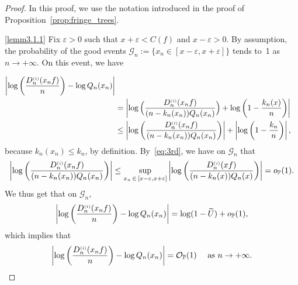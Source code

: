 \documentclass[10pt]{amsart}
\theoremstyle{definition}\newtheorem{defi}[theo]{Definition}\newtheorem{rema}[theo]{Remark}\newtheorem{exam}[theo]{Example}\newtheorem{exem}[theo]{Example}\newtheorem{nota}[theo]{Notation}
\newcommand{\sss}{\ensuremath{\scriptscriptstyle}}
\newcommand{\op}{{o_{\bbP}}}
\newcommand{\Op}{{\mathcal O_{\bbP}}}
\newcommand{\bbP}{\mathbb{P}}
\newcommand{\clG}{\mathcal{G}}
\begin{document}
\begin{proof}
In this proof, we use the notation introduced in the proof of Proposition~\ref{prop:fringe_trees}.

\noindent\eqref{lemm3.1.1} Fix $\varepsilon>0$ such that $x+\varepsilon<C(f)$ and $x-\varepsilon >0.$ By assumption, the probability of the good events $\clG_n := \{x_n\in [x-\varepsilon, x+\varepsilon]\}$ tends to~1 as $n\to+\infty$. On this event, we have

\begin{align*}
\left|\log\left(\frac{D_n^{\sss (i)}(x_n f)}n \right)-\log Q_n(x_n)\right|\\
&= \left|\log\Big(\frac{D_n^{\sss (i)}(x_n f)}{(n-k_n(x_n))Q_n(x_n)}\Big)+\log \left(1-\frac{k_n(x)}{n}\right)\right|\\
&\leq \left|\log\left(\frac{D_n^{\sss (i)}(x_n f)}{(n-k_n(x_n))Q_n(x_n)}\right)\right| + \left|\log \left(1-\frac{k_n}{n}\right)\right|,
\end{align*}
because $k_n(x_n) \leq k_n$, by definition. By~\eqref{eq:3rd}, we have on $\clG_n$ that
\[
\left|\log\left(\frac{D_n^{\sss (i)}(x_n f)}{(n-k_n(x_n))Q_n(x_n)}\right)\right|
\leq \sup_{x_n\,\in\,[x-\varepsilon, x+\varepsilon]} \left|\log\left(\frac{D_n^{\sss (i)}(x f)}{(n-k_n(x))Q_n(x)}\right)\right| = \op(1).
\]
We thus get that on $\clG_n,$
\[
\left|\log\left(\frac{D_n^{\sss (i)}(x_n f)}n\right)-\log Q_n(x_n)\right| = \log(1-\widetilde U) + \op(1),
\]
which implies that
\begin{equation}\label{eq:O1Approx}
\left|\log\left(\frac{D_n^{\sss (i)}(x_n f)}n\right)-\log Q_n(x_n)\right| =\Op(1)\quad\text{ as }n\to+\infty.
\end{equation}



\end{proof}
\end{document}
